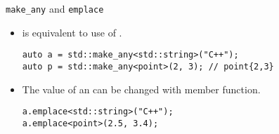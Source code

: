 \begin{frame}[t,fragile]{\texttt{make\_any} and \texttt{emplace}}
\begin{itemize}
  \item {} is equivalent to use of .
\begin{lstlisting}
auto a = std::make_any<std::string>("C++");
auto p = std::make_any<point>(2, 3); // point{2,3}
\end{lstlisting}

  \item The value of an  can be changed with 
        member function.
\begin{lstlisting}
a.emplace<std::string>("C++");
a.emplace<point>(2.5, 3.4);
\end{lstlisting}
\end{itemize}
\end{frame}

